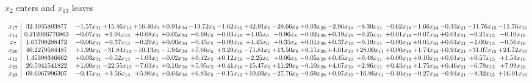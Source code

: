 \documentclass[9pt]{article}
\begin{document}
 $ x_{2} $ enters and $ x_{13} $ leaves 

 \[\begin{array}{c| c c@{\hskip 2pt} c@{\hskip 2pt} c@{\hskip 2pt} c@{\hskip 2pt} c@{\hskip 2pt} c@{\hskip 2pt} c@{\hskip 2pt} c@{\hskip 2pt} c@{\hskip 2pt} c@{\hskip 2pt} c@{\hskip 2pt} c@{\hskip 2pt} c@{\hskip 2pt} c@{\hskip 2pt} c@{\hskip 2pt} c@{\hskip 2pt} }
 x_{17}   &  32.3035803877 & -1.57 x_{31} & + 15.46 x_{13} & + 16.40 x_{3} & +  0.91 x_{30} & -13.72 x_{5} & -1.62 x_{19} & + 42.91 x_{6} & -29.66 x_{8} & +  0.03 x_{29} & -2.96 x_{10} & -8.30 x_{11} & -0.62 x_{18} & -1.66 x_{24} & -0.33 x_{21} & -11.76 x_{15} & -11.76 x_{16}\\
 x_{14}   &  0.212066776863 & -0.07 x_{31} & +  1.04 x_{13} & +  0.08 x_{3} & +  0.05 x_{30} & -0.69 x_{5} & -0.03 x_{19} & +  1.05 x_{6} & -0.96 x_{8} & -0.02 x_{29} & +  0.19 x_{10} & -0.25 x_{11} & +  0.01 x_{18} & -0.07 x_{24} & +  0.01 x_{21} & -0.21 x_{15} & -0.10 x_{16}\\
 x_{7}   &  1.63708288472 & -0.06 x_{31} & -0.37 x_{13} & -0.29 x_{3} & +  0.00 x_{30} & -0.45 x_{5} & -0.09 x_{19} & +  1.45 x_{6} & +  0.35 x_{8} & +  0.01 x_{29} & +  0.37 x_{10} & -0.19 x_{11} & -0.00 x_{18} & +  0.01 x_{24} & +  0.04 x_{21} & -1.00 x_{15} & -0.56 x_{16}\\
 x_{20}   &  46.2279584487 & +  1.99 x_{31} & -31.84 x_{13} & -10.13 x_{3} & -1.94 x_{30} & +  7.66 x_{5} & +  3.29 x_{19} & -71.81 x_{6} & + 13.50 x_{8} & +  0.11 x_{29} & +  4.01 x_{10} & + 28.00 x_{11} & +  0.00 x_{18} & +  1.74 x_{24} & +  0.94 x_{21} & + 31.07 x_{15} & + 24.72 x_{16}\\
 x_{12}   &  1.45398346662 & +  0.03 x_{31} & -0.52 x_{13} & -1.03 x_{3} & -0.02 x_{30} & +  0.12 x_{5} & +  0.12 x_{19} & -2.25 x_{6} & +  0.06 x_{8} & -0.05 x_{29} & +  0.45 x_{10} & +  0.48 x_{11} & +  0.00 x_{18} & +  0.10 x_{24} & +  0.01 x_{21} & +  0.57 x_{15} & +  1.54 x_{16}\\
 x_{22}   &  20.5041541822 & +  1.00 x_{31} & -22.55 x_{13} & -7.03 x_{3} & +  0.10 x_{30} & +  5.05 x_{5} & +  0.41 x_{19} & -15.47 x_{6} & + 11.29 x_{8} & -0.10 x_{29} & +  4.67 x_{10} & +  2.86 x_{11} & +  0.43 x_{18} & +  1.75 x_{24} & +  0.46 x_{21} & -6.78 x_{15} & +  7.99 x_{16}\\
 x_{23}   &  69.6067996307 & -0.47 x_{31} & +  3.56 x_{13} & +  5.90 x_{3} & +  0.64 x_{30} & +  6.83 x_{5} & -0.15 x_{19} & + 10.03 x_{6} & -27.76 x_{8} & -0.69 x_{29} & +  0.97 x_{10} & -16.86 x_{11} & -0.40 x_{18} & -0.27 x_{24} & -0.94 x_{21} & -8.32 x_{15} & + 16.01 x_{16}\\

\end{array}\]
\end{document}
